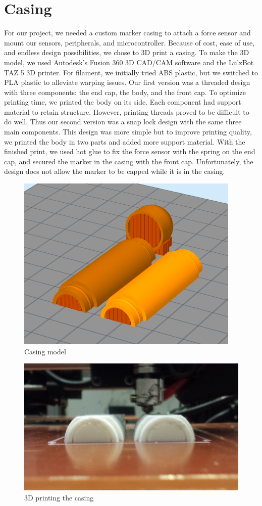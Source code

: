 \documentclass[12pt,journal]{IEEEtran}
\begin{document}
\section{Casing}
	For our project, we needed a custom marker casing to attach a force sensor and mount our sensors, peripherals, and microcontroller. Because of cost, ease of use, and endless design possibilities, we chose to 3D print a casing. To make the 3D model, we used Autodesk’s Fusion 360 3D CAD/CAM software and the LulzBot TAZ 5 3D printer. For filament, we initially tried ABS plastic, but we switched to PLA plastic to alleviate warping issues.
	Our first version was a threaded design with three components: the end cap, the body, and the front cap. To optimize printing time, we printed the body on its side. Each component had support material to retain structure. However, printing threads proved to be difficult to do well. Thus our second version was a snap lock design with the same three main components. This design was more simple but to improve printing quality, we printed the body in two parts and added more support material. 
With the finished print, we used hot glue to fix the force sensor with the spring on the end cap, and secured the marker in the casing with the front cap. Unfortunately, the design does not allow the marker to be capped while it is in the casing.

\begin{figure}[h]
  \centering
    \includegraphics[width=0.6\linewidth]{figures/3d-model}
  \caption{Casing model}
  \label{fig:3d-model}
\end{figure}

\begin{figure}[h]
  \centering
    \includegraphics[width=0.6\linewidth]{figures/3d-print}
  \caption{3D printing the casing}
  \label{fig:3d-print}
\end{figure}
\end{document}
